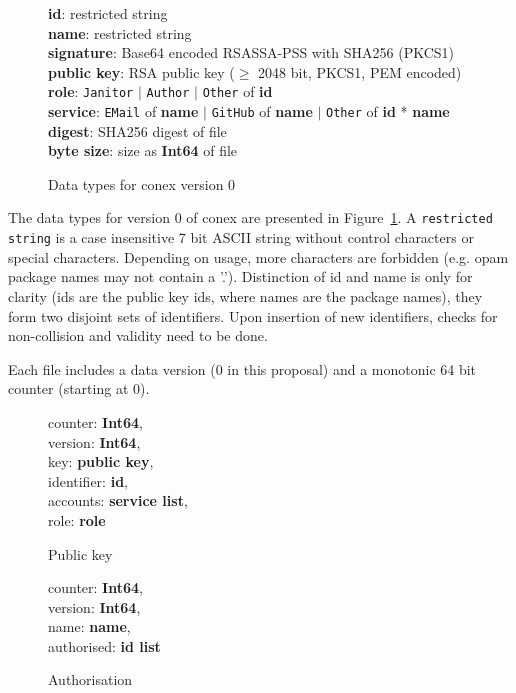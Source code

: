 \documentclass[nocopyrightspace]{sigplanconf}
\begin{document}
\begin{figure}
\textbf{id}: restricted string\\
\textbf{name}: restricted string\\
\textbf{signature}: Base64 encoded RSASSA-PSS with SHA256 (PKCS1)\\
\textbf{public key}: RSA public key ($\geq$ 2048 bit, PKCS1, PEM encoded)\\
\textbf{role}: \texttt{Janitor} $|$ \texttt{Author} $|$ \texttt{Other} of \textbf{id}\\
\textbf{service}: \texttt{EMail} of \textbf{name} $|$ \texttt{GitHub} of \textbf{name} $|$ \texttt{Other} of \textbf{id} * \textbf{name}\\
\textbf{digest}: SHA256 digest of file\\
\textbf{byte size}: size as \textbf{Int64} of file
\caption{\label{fig:datatypes0}
  Data types for conex version 0}
\end{figure}

The data types for version 0 of conex are presented in Figure~\ref{fig:datatypes0}.
A \texttt{restricted string} is a case insensitive 7 bit ASCII string without control characters or special characters.
Depending on usage, more characters are forbidden (e.g. opam package names may not contain a '.').
Distinction of id and name is only for clarity (ids are the public key ids, where names are the package names), they form two disjoint sets of identifiers.
Upon insertion of new identifiers, checks for non-collision and validity need to be done.

Each file includes a data version (0 in this proposal) and a monotonic 64 bit counter (starting at 0).

\begin{figure}
  \centering
  \begin{minipage}{\hsize}
    \begin{minipage}{.4 \hsize}
counter: \textbf{Int64},\\
version: \textbf{Int64},\\
key: \textbf{public key},\\
identifier: \textbf{id},\\
accounts: \textbf{service list},\\
role: \textbf{role}
 \caption{\label{fig:keyformat} Public key}
    \end{minipage}
    \begin{minipage}{.4 \hsize}
counter: \textbf{Int64},\\
version: \textbf{Int64},\\
name: \textbf{name},\\
authorised: \textbf{id list}
 \caption{\label{fig:authformat} Authorisation}
    \end{minipage}
  \end{minipage}
\end{figure}
\end{document}
